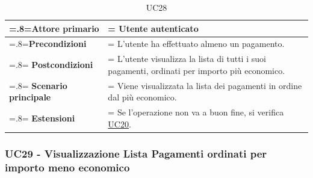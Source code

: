             \begin{table}[H]
                \centering
                \renewcommand{\arraystretch}{1.8}
                \renewcommand\tabularxcolumn[1]{m{#1}}
                \begin{tabularx}{0.9\textwidth} {
                    >{\hsize=.8\hsize\linewidth=\hsize}X
                    >{\hsize=1.2\hsize\linewidth=\hsize}X}
                    \hline
                    \textbf{Attore primario} & Utente autenticato \\
                    \hline
                    \textbf{Precondizioni} & L'utente ha effettuato almeno un pagamento. \\
                    \hline
                    \textbf{Postcondizioni} & L'utente visualizza la lista di tutti i suoi pagamenti, ordinati per importo più economico. \\
                    \hline
                    \textbf{Scenario principale} & Viene visualizzata la lista dei pagamenti in ordine dal più economico. \\
                    \hline
                    \textbf{Estensioni} & Se l'operazione non va a buon fine, si verifica \hyperref[UC20]{UC20}. \\
                    \hline
                \end{tabularx}
                \caption{UC28}
            \end{table}

        \subsubsection{UC29 - Visualizzazione Lista Pagamenti ordinati per importo meno economico}
        \label{UC29}

